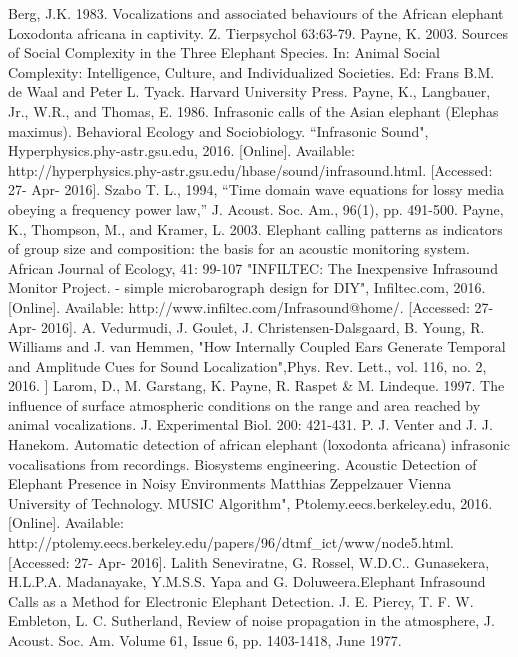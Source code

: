 \documentclass[11pt]{article}
\numberwithin{figure}{section}
\numberwithin{table}{section}
\begin{document}
\newpage
\begin{thebibliography}{1}
 Berg, J.K. 1983. Vocalizations and associated behaviours of the African elephant Loxodonta africana in captivity. Z. Tierpsychol 63:63-79.
Payne, K. 2003. Sources of Social Complexity in the Three Elephant Species. In: Animal Social Complexity: Intelligence, Culture, and Individualized Societies. Ed: Frans B.M. de Waal and Peter L. Tyack. Harvard University Press.
 Payne, K., Langbauer, Jr., W.R., and Thomas, E. 1986. Infrasonic calls of the Asian elephant (Elephas maximus). Behavioral Ecology and Sociobiology.
 “Infrasonic Sound", Hyperphysics.phy-astr.gsu.edu, 2016. [Online]. Available: http://hyperphysics.phy-astr.gsu.edu/hbase/sound/infrasound.html. [Accessed: 27- Apr- 2016].
 Szabo T. L., 1994, “Time domain wave equations for lossy media obeying a frequency power law,” J. Acoust. Soc. Am., 96(1), pp. 491-500.
 Payne, K., Thompson, M., and Kramer, L. 2003. Elephant calling patterns as indicators of group size and composition: the basis for an acoustic monitoring system. African Journal of Ecology, 41: 99-107
 "INFILTEC: The Inexpensive Infrasound Monitor Project. - simple microbarograph design for DIY", Infiltec.com, 2016. [Online]. Available: http://www.infiltec.com/Infrasound@home/. [Accessed: 27- Apr- 2016].
 A. Vedurmudi, J. Goulet, J. Christensen-Dalsgaard, B. Young, R. Williams and J. van Hemmen, "How Internally Coupled Ears Generate Temporal and Amplitude Cues for Sound Localization",Phys. Rev. Lett., vol. 116, no. 2, 2016.
 ] Larom, D., M. Garstang, K. Payne, R. Raspet \& M. Lindeque. 1997. The influence of surface atmospheric conditions on the range and area reached by animal vocalizations. J. Experimental Biol. 200: 421-431.
 P. J. Venter and J. J. Hanekom. Automatic detection of african elephant (loxodonta africana) infrasonic vocalisations from recordings. Biosystems engineering.
 Acoustic Detection of Elephant Presence in Noisy Environments Matthias Zeppelzauer Vienna University of Technology.
 MUSIC Algorithm", Ptolemy.eecs.berkeley.edu, 2016. [Online]. Available: http://ptolemy.eecs.berkeley.edu/papers/96/dtmf\_ict/www/node5.html. [Accessed: 27- Apr- 2016].
 Lalith Seneviratne, G. Rossel, W.D.C.. Gunasekera, H.L.P.A. Madanayake, Y.M.S.S. Yapa and G. Doluweera.Elephant Infrasound Calls as a Method for Electronic Elephant Detection.
 J. E. Piercy, T. F. W. Embleton, L. C. Sutherland, Review of noise propagation in the atmosphere, J. Acoust. Soc. Am. Volume 61, Issue 6, pp. 1403-1418, June 1977.

\end{thebibliography}
\end{document}

